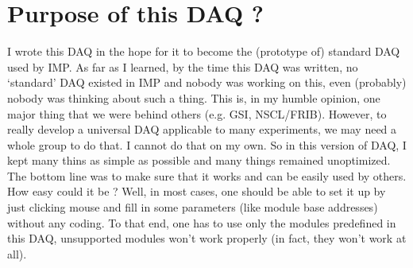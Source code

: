\documentclass[a4paper,12pt]{article}
\begin{document}
	\section{Purpose of this DAQ ?}
	I wrote this DAQ in the hope for it to become the (prototype of)
	standard DAQ used by IMP. As far as I learned, by the time this DAQ was
	written, no `standard' DAQ existed in IMP and nobody was working on
	this, even (probably) nobody was thinking about such a thing. This is,
	in my humble opinion, one major thing that we were behind others (e.g.
	GSI, NSCL/FRIB). However, to really develop a universal DAQ applicable
	to many experiments, we may need a whole group to do that. I cannot do
	that on my own. So in this version of DAQ, I kept many thins as simple
	as possible and many things remained unoptimized. The bottom line was to
	make sure that it works and can be easily used by others. How easy could
	it be ? Well, in most cases, one should be able to set it up by just
	clicking mouse and fill in some parameters (like module base addresses)
	without any coding. To that end, one has to use only the modules
	predefined in this DAQ, unsupported modules won't work properly (in
	fact, they won't work at all).
\end{document}
